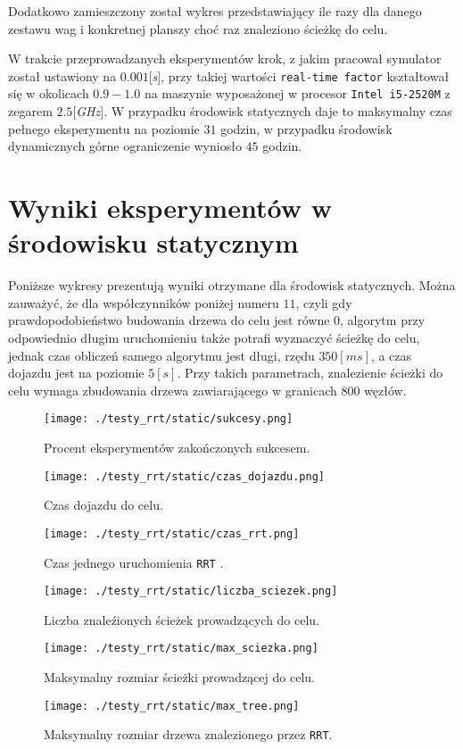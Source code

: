 Dodatkowo zamieszczony został wykres przedstawiający ile razy dla danego zestawu wag i konkretnej planszy choć raz znaleziono ścieżkę do celu.

W trakcie przeprowadzanych eksperymentów krok, z jakim pracował symulator został ustawiony na $0.001$[\textit{s}], przy takiej wartości \texttt{real-time factor} kształtował
się w okolicach $0.9-1.0$ na maszynie wyposażonej w procesor \texttt{Intel i5-2520M} z zegarem $2.5$[\textit{GHz}]. W przypadku środowisk statycznych daje to maksymalny
czas pełnego eksperymentu na poziomie $31$ godzin, w przypadku środowisk dynamicznych górne ograniczenie wyniosło $45$ godzin.
\section{Wyniki eksperymentów w środowisku statycznym}
Poniższe wykresy prezentują wyniki otrzymane dla środowisk statycznych. Można zauważyć, że dla współczynników poniżej numeru $11$, czyli gdy prawdopodobieństwo budowania
drzewa do celu jest równe 0, algorytm przy odpowiednio długim uruchomieniu także potrafi wyznaczyć ścieżkę do celu, jednak czas obliczeń samego algorytmu jest długi, rzędu
$350[ms]$, a czas dojazdu jest na poziomie $5[s]$. Przy takich parametrach, znalezienie ścieżki do celu wymaga zbudowania drzewa zawiarającego w granicach $800$ węzłów.
\begin{figure}[H]
\centering
\texttt{[image: ./testy\_rrt/static/sukcesy.png]}
\caption{ Procent eksperymentów zakończonych sukcesem.} \label{fig:stat_sukcesy}
\end{figure} 
\begin{figure}[H]
\centering
\texttt{[image: ./testy\_rrt/static/czas\_dojazdu.png]}
\caption{ Czas dojazdu do celu.} \label{fig:stat_czas_dojazdu}
\end{figure} 
\begin{figure}[H]
\centering
\texttt{[image: ./testy\_rrt/static/czas\_rrt.png]}
\caption{ Czas jednego uruchomienia \texttt{RRT} .} \label{fig:stat_czas_rrt}
\end{figure} 
\begin{figure}[H]
\centering
\texttt{[image: ./testy\_rrt/static/liczba\_sciezek.png]}
\caption{ Liczba znaleźionych ścieżek prowadzących do celu.} \label{fig:stat_liczba_sciezek}
\end{figure} 
\begin{figure}[H]
\centering
\texttt{[image: ./testy\_rrt/static/max\_sciezka.png]}
\caption{ Maksymalny rozmiar ścieżki prowadzącej do celu.} \label{fig:stat_max_sciezka}
\end{figure} 
\begin{figure}[H]
\centering
\texttt{[image: ./testy\_rrt/static/max\_tree.png]}
\caption{ Maksymalny rozmiar drzewa znalezionego przez \texttt{RRT}.} \label{fig:stat_max_tree}
\end{figure}
